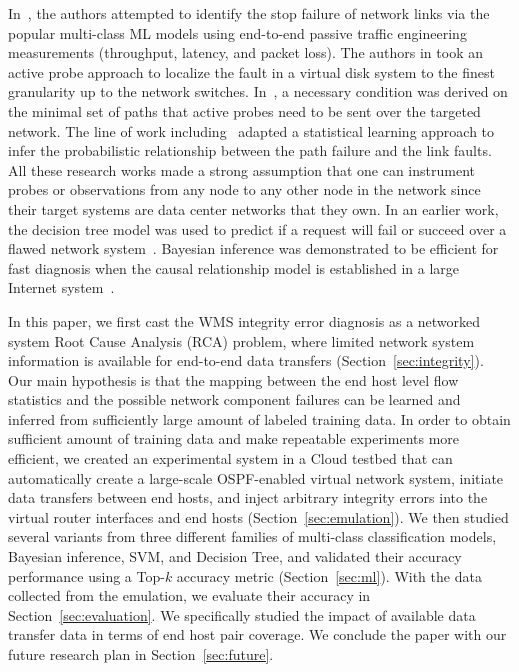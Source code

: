 In~\cite{Link-JIoT-2019}, the authors attempted to identify the stop failure of network links via the popular multi-class ML models using end-to-end passive traffic engineering measurements (throughput, latency, and packet loss). The authors in \cite{DeepView:NSDI18} took an active probe approach to localize the fault in a virtual disk system to the finest granularity up to the network switches. In~\cite{netbouncer:nsdi18}, a necessary condition was derived on the minimal set of paths that active probes need to be sent over the targeted network. The line of work including~\cite{NetPoirot:Sigcomm2016,KDD14} adapted a statistical learning approach to infer the probabilistic relationship between the path failure and the link faults. All these research works made a strong assumption that one can instrument probes or observations from any node to any other node in the network since their target systems are data center networks that they own. In an earlier work, the decision tree model was used to predict if a request will fail or succeed over a flawed network system~\cite{DT:2004}. Bayesian inference was demonstrated to be efficient for fast diagnosis when the causal relationship model is established in a large Internet system~\cite{BN-Internet:2007}.

In this paper, we first cast the WMS integrity error diagnosis as a networked system Root Cause Analysis (RCA) problem, where limited network system information is available for end-to-end data transfers (Section~\ref{sec:integrity}). Our main hypothesis is that the mapping between the end host level flow statistics and the possible network component failures can be learned and inferred from sufficiently large amount of labeled training data. In order to obtain sufficient amount of training data and make repeatable experiments more efficient, we created an experimental system in a Cloud testbed that can automatically create a large-scale OSPF-enabled virtual network system, initiate data transfers between end hosts, and inject arbitrary integrity errors into the virtual router interfaces and end hosts (Section~\ref{sec:emulation}). We then studied several variants from three different families of multi-class classification models, Bayesian inference, SVM, and Decision Tree, and validated their accuracy performance using a Top-$k$ accuracy metric (Section~\ref{sec:ml}). With the data collected from the emulation, we evaluate their accuracy in Section~\ref{sec:evaluation}. We specifically studied the impact of available data transfer data in terms of end host pair coverage. We conclude the paper with our future research plan in Section~\ref{sec:future}.
